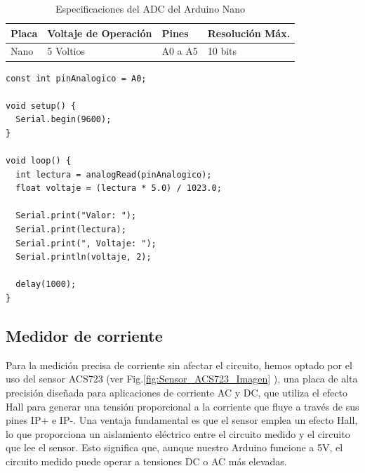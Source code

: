 \begin{table}[h]
\centering
\caption{Especificaciones del ADC del Arduino Nano}
\label{tab:ArduinoADC}
\begin{tabular}{llll}
\toprule
\textbf{Placa} & \textbf{Voltaje de Operación} & \textbf{Pines} & \textbf{Resolución Máx.} \\
\midrule
Nano & 5 Voltios & A0 a A5 & 10 bits \\
\bottomrule
\end{tabular}
\end{table}



\begin{lstlisting}[caption={Prueba unitaria para ADC desarrollado en Arduino IDE}, label={lst:ADCode}]
const int pinAnalogico = A0;

void setup() {
  Serial.begin(9600);
}

void loop() {
  int lectura = analogRead(pinAnalogico);
  float voltaje = (lectura * 5.0) / 1023.0;

  Serial.print("Valor: ");
  Serial.print(lectura);
  Serial.print(", Voltaje: ");
  Serial.println(voltaje, 2);

  delay(1000);
}

\end{lstlisting}


\newpage
\subsection{Medidor de corriente}

Para la medición precisa de corriente sin afectar el circuito, hemos optado por el uso del sensor ACS723 (ver Fig.\ref{fig:Sensor_ACS723_Imagen} ), una placa de alta precisión diseñada para aplicaciones de corriente AC y DC, que utiliza el efecto Hall para generar una tensión proporcional a la corriente que fluye a través de sus pines IP+ e IP-. Una ventaja fundamental es que el sensor emplea un efecto Hall, lo que proporciona un aislamiento eléctrico entre el circuito medido y el circuito que lee el sensor. Esto significa que, aunque nuestro Arduino funcione a 5V, el circuito medido puede operar a tensiones DC o AC más elevadas.

